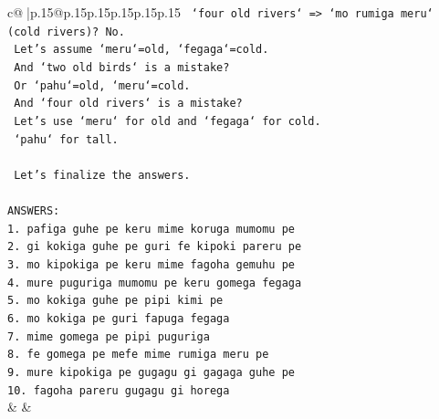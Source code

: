 \documentclass{article}
\begin{document}
{\begin{supertabular}{c@{$\;$}|p{.15\linewidth}@{}p{.15\linewidth}p{.15\linewidth}p{.15\linewidth}p{.15\linewidth}p{.15\linewidth}}
{{{\texttt{    `four old rivers` => `mo rumiga meru` (cold rivers)? No.} \\
\texttt{    Let's assume `meru`=old, `fegaga`=cold.} \\
\texttt{    And `two old birds` is a mistake?} \\
\texttt{    Or `pahu`=old, `meru`=cold.} \\
\texttt{    And `four old rivers` is a mistake?} \\
\texttt{    Let's use `meru` for old and `fegaga` for cold.} \\
\texttt{    `pahu` for tall.} \\
\\ 
\texttt{    Let's finalize the answers.} \\
\\ 
\texttt{ANSWERS:} \\
\texttt{1. pafiga guhe pe keru mime koruga mumomu pe} \\
\texttt{2. gi kokiga guhe pe guri fe kipoki pareru pe} \\
\texttt{3. mo kipokiga pe keru mime fagoha gemuhu pe} \\
\texttt{4. mure puguriga mumomu pe keru gomega fegaga} \\
\texttt{5. mo kokiga guhe pe pipi kimi pe} \\
\texttt{6. mo kokiga pe guri fapuga fegaga} \\
\texttt{7. mime gomega pe pipi puguriga} \\
\texttt{8. fe gomega pe mefe mime rumiga meru pe} \\
\texttt{9. mure kipokiga pe gugagu gi gagaga guhe pe} \\
\texttt{10. fagoha pareru gugagu gi horega} \\
            }
        }
    }
    & & \\ \\


\end{supertabular}}
\end{document}
